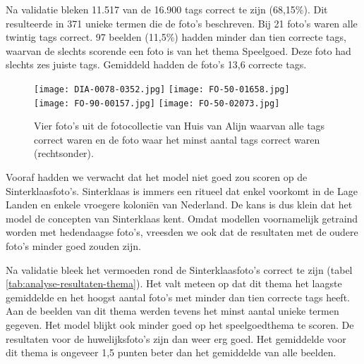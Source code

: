 Na validatie bleken 11.517 van de 16.900 tags correct te zijn (68,15\%). Dit resulteerde in 371 unieke termen die de foto’s beschreven. Bij 21 foto’s waren alle twintig tags correct. 97 beelden (11,5\%) hadden minder dan tien correcte tags, waarvan de slechts scorende een foto is van het thema Speelgoed. Deze foto had slechts zes juiste tags. Gemiddeld hadden de foto’s 13,6 correcte tags.

\begin{figure}
	\centering
	\texttt{[image: DIA-0078-0352.jpg]}\hfill
	\texttt{[image: FO-50-01658.jpg]}\hfill
	\\[\smallskipamount]
	\texttt{[image: FO-90-00157.jpg]}\hfill
	\texttt{[image: FO-50-02073.jpg]}\hfill
	\caption[Enkele voorbeelden van foto's die goed of slecht getagged werden door het ingbouwde Clarifai-model]{Vier foto’s uit de fotocollectie van Huis van Alijn waarvan alle tags correct waren en de foto waar het minst aantal tags correct waren (rechtsonder).}
\end{figure}

Vooraf hadden we verwacht dat het model niet goed zou scoren op de Sinterklaasfoto’s. Sinterklaas is immers een ritueel dat enkel voorkomt in de Lage Landen en enkele vroegere koloniën van Nederland. De kans is dus klein dat het model de concepten van Sinterklaas kent. Omdat modellen voornamelijk getraind worden met hedendaagse foto’s, vreesden we ook dat de resultaten met de oudere foto’s minder goed zouden zijn.

Na validatie bleek het vermoeden rond de Sinterklaasfoto’s correct te zijn (tabel \ref{tab:analyse-resultaten-thema}). Het valt meteen op dat dit thema het laagste gemiddelde en het hoogst aantal foto’s met minder dan tien correcte tags heeft. Aan de beelden van dit thema werden tevens het minst aantal unieke termen gegeven. Het model blijkt ook minder goed op het speelgoedthema te scoren. De resultaten voor de huwelijksfoto’s zijn dan weer erg goed. Het gemiddelde voor dit thema is ongeveer 1,5 punten beter dan het gemiddelde van alle beelden.
	

